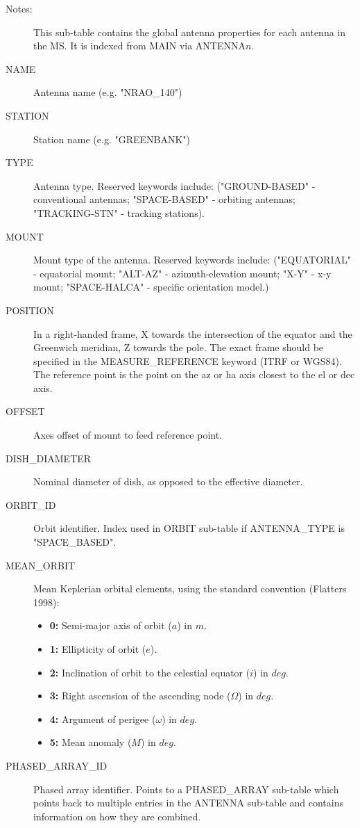 \documentclass{article}
\begin{document}
\begin{description}

\item[Notes:] This sub-table contains the global antenna properties
for each antenna in the MS. It is indexed from MAIN via
ANTENNA$n$.

\item[NAME] Antenna name (e.g. "NRAO\_140")

\item[STATION] Station name (e.g. "GREENBANK")

\item[TYPE] Antenna type. Reserved keywords include:
("GROUND-BASED" - conventional antennas; "SPACE-BASED" - orbiting
antennas; "TRACKING-STN" - tracking stations).

\item[MOUNT] Mount type of the antenna. Reserved keywords include:
("EQUATORIAL" - equatorial mount; "ALT-AZ" - azimuth-elevation mount; "X-Y"
- x-y mount; "SPACE-HALCA" - specific orientation model.)

\item[POSITION] In a right-handed frame, X towards the intersection of
the equator and the Greenwich meridian, Z towards the pole. The exact
frame should be specified in the MEASURE\_REFERENCE keyword (ITRF or
WGS84). The reference point is the point on the az or ha axis closest
to the el or dec axis.

\item[OFFSET] Axes offset of mount to feed reference point.

\item[DISH\_DIAMETER] Nominal diameter of dish, as opposed to the
effective diameter.

\item[ORBIT\_ID] Orbit identifier. Index used in ORBIT sub-table if
ANTENNA\_TYPE is "SPACE\_BASED".

\item[MEAN\_ORBIT] Mean Keplerian orbital elements, using the
standard convention (Flatters 1998): 
\begin{itemize}
   \item{{\bf 0:} Semi-major axis of orbit ($a$) in $m$.}
   \item{{\bf 1:} Ellipticity of orbit ($e$).}
   \item{{\bf 2:} Inclination of orbit to the celestial equator ($i$) 
                  in $deg.$}
   \item{{\bf 3:} Right ascension of the ascending node ($\Omega$) in $deg.$}
   \item{{\bf 4:} Argument of perigee ($\omega$) in $deg.$}
   \item{{\bf 5:} Mean anomaly ($M$) in $deg.$}
\end{itemize}

\item[PHASED\_ARRAY\_ID] Phased array identifier. Points to a
PHASED\_ARRAY sub-table which points back to multiple entries in the
ANTENNA sub-table and contains information on how they are combined.

\end{description}
\end{document}
